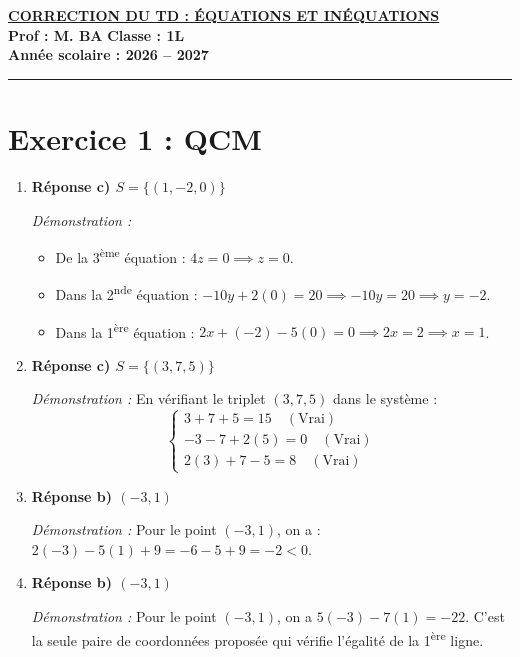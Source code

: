 \documentclass[12pt,a4paper]{article}
\begin{document}
\begin{center}
    \Large\textbf{\underline{CORRECTION DU TD : ÉQUATIONS ET INÉQUATIONS}}\\[0.2cm]
    \normalsize\textbf{Prof : M. BA} \hfill \textbf{Classe : 1L}\\[0.1cm]
    \textbf{Année scolaire : 2026 -- 2027}
\end{center}

\hrule
\vspace{0.5cm}

\section*{Exercice 1 : QCM}

\begin{enumerate}
    \item \textbf{Réponse c) $S = \{(1, -2, 0)\}$}
    
    \textit{Démonstration :}
    \begin{itemize}[label=$\bullet$]
        \item De la 3\textsuperscript{ème} équation : $4z = 0 \implies z = 0$.
        \item Dans la 2\textsuperscript{nde} équation : $-10y + 2(0) = 20 \implies -10y = 20 \implies y = -2$.
        \item Dans la 1\textsuperscript{ère} équation : $2x + (-2) - 5(0) = 0 \implies 2x = 2 \implies x = 1$.
    \end{itemize}

    \item \textbf{Réponse c) $S = \{(3, 7, 5)\}$}
    
    \textit{Démonstration :} En vérifiant le triplet $(3,7,5)$ dans le système :
    \[
    \begin{cases}
    3 + 7 + 5 = 15 \quad (\text{Vrai}) \\
    -3 - 7 + 2(5) = 0 \quad (\text{Vrai}) \\
    2(3) + 7 - 5 = 8 \quad (\text{Vrai})
    \end{cases}
    \]

    \item \textbf{Réponse b) $(-3, 1)$}
    
    \textit{Démonstration :} Pour le point $(-3, 1)$, on a : $2(-3) - 5(1) + 9 = -6 - 5 + 9 = -2 < 0$.

    \item \textbf{Réponse b) $(-3, 1)$}
    
    \textit{Démonstration :} Pour le point $(-3, 1)$, on a $5(-3) - 7(1) = -22$. C'est la seule paire de coordonnées proposée qui vérifie l'égalité de la 1\textsuperscript{ère} ligne.
\end{enumerate}
\end{document}
